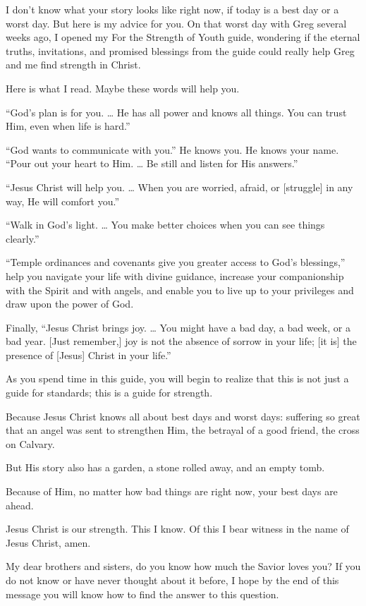 \documentclass[letterpaper, 11pt]{report}
\newcommand{\speaker}{}
\newcommand{\talk}{}
\newcommand{\talkdatestr}{}
\newcommand{\setspeaker}[1]{\renewcommand{\speaker}{#1}}
\newcommand{\settalk}[1]{\renewcommand{\talk}{#1}}
\newcommand{\talkheading}[2]{%
    \vspace{1em}
    \noindent{\huge\bfseries #1}
    \par\nopagebreak\vspace{0.25em}
    \noindent{\normalsize\bfseries #2\ifx\talkdatestr\empty\else,\ \talkdatestr\fi}
    \par\nopagebreak\vspace{0.5em}
}
\begin{document}
I don’t know what your story looks like right now, if today is a best day or a worst day. But here is my advice for you. On that worst day with Greg several weeks ago, I opened my For the Strength of Youth guide, wondering if the eternal truths, invitations, and promised blessings from the guide could really help Greg and me find strength in Christ.

Here is what I read. Maybe these words will help you.

“God’s plan is for you. … He has all power and knows all things. You can trust Him, even when life is hard.”

“God wants to communicate with you.” He knows you. He knows your name. “Pour out your heart to Him. … Be still and listen for His answers.”

“Jesus Christ will help you. … When you are worried, afraid, or [struggle] in any way, He will comfort you.”

“Walk in God’s light. … You make better choices when you can see things clearly.”

“Temple ordinances and covenants give you greater access to God’s blessings,” help you navigate your life with divine guidance, increase your companionship with the Spirit and with angels, and enable you to live up to your privileges and draw upon the power of God.

Finally, “Jesus Christ brings joy. … You might have a bad day, a bad week, or a bad year. [Just remember,] joy is not the absence of sorrow in your life; [it is] the presence of [Jesus] Christ in your life.”

As you spend time in this guide, you will begin to realize that this is not just a guide for standards; this is a guide for strength.

Because Jesus Christ knows all about best days and worst days: suffering so great that an angel was sent to strengthen Him, the betrayal of a good friend, the cross on Calvary.

But His story also has a garden, a stone rolled away, and an empty tomb.

Because of Him, no matter how bad things are right now, your best days are ahead.

Jesus Christ is our strength. This I know. Of this I bear witness in the name of Jesus Christ, amen.

\newpage
\settalk{I Feel My Savior’s Love}
\setspeaker{Pedro X. Larreal}
\talkheading{I Feel My Savior’s Love}{Pedro X. Larreal}

My dear brothers and sisters, do you know how much the Savior loves you? If you do not know or have never thought about it before, I hope by the end of this message you will know how to find the answer to this question.
\end{document}
